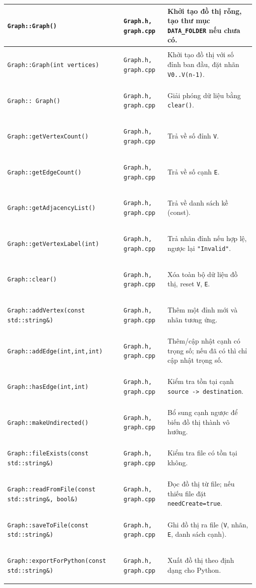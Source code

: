 \documentclass[14pt,a4paper]{report}
\begin{document}
\begin{longtable}{|>{\bfseries\raggedright\arraybackslash}p{}|
                   >{\bfseries\raggedright\arraybackslash}p{2.8cm}|
                   >{\raggedright\arraybackslash}p{}|}
\texttt{Graph::Graph()} & \texttt{Graph.h, graph.cpp} & Khởi tạo đồ thị rỗng, tạo thư mục \texttt{DATA\_FOLDER} nếu chưa có.\\ \hline
\texttt{Graph::Graph(int vertices)} & \texttt{Graph.h, graph.cpp} & Khởi tạo đồ thị với số đỉnh ban đầu, đặt nhãn \texttt{V0..V(n-1)}.\\ \hline
\texttt{Graph::~Graph()} & \texttt{Graph.h, graph.cpp} & Giải phóng dữ liệu bằng \texttt{clear()}.\\ \hline
\texttt{Graph::getVertexCount()} & \texttt{Graph.h, graph.cpp} & Trả về số đỉnh \texttt{V}.\\ \hline
\texttt{Graph::getEdgeCount()} & \texttt{Graph.h, graph.cpp} & Trả về số cạnh \texttt{E}.\\ \hline
\texttt{Graph::getAdjacencyList()} & \texttt{Graph.h, graph.cpp} & Trả về danh sách kề (const).\\ \hline
\texttt{Graph::getVertexLabel(int)} & \texttt{Graph.h, graph.cpp} & Trả nhãn đỉnh nếu hợp lệ, ngược lại \texttt{"Invalid"}.\\ \hline
\texttt{Graph::clear()} & \texttt{Graph.h, graph.cpp} & Xóa toàn bộ dữ liệu đồ thị, reset \texttt{V}, \texttt{E}.\\ \hline
\texttt{Graph::addVertex(const std::string\&)} & \texttt{Graph.h, graph.cpp} & Thêm một đỉnh mới và nhãn tương ứng.\\ \hline
\texttt{Graph::addEdge(int,int,int)} & \texttt{Graph.h, graph.cpp} & Thêm/cập nhật cạnh có trọng số; nếu đã có thì chỉ cập nhật trọng số.\\ \hline
\texttt{Graph::hasEdge(int,int)} & \texttt{Graph.h, graph.cpp} & Kiểm tra tồn tại cạnh \texttt{source -> destination}.\\ \hline
\texttt{Graph::makeUndirected()} & \texttt{Graph.h, graph.cpp} & Bổ sung cạnh ngược để biến đồ thị thành vô hướng.\\ \hline
\texttt{Graph::fileExists(const std::string\&)} & \texttt{Graph.h, graph.cpp} & Kiểm tra file có tồn tại không.\\ \hline
\texttt{Graph::readFromFile(const std::string\&, bool\&)} & \texttt{Graph.h, graph.cpp} & Đọc đồ thị từ file; nếu thiếu file đặt \texttt{needCreate=true}.\\ \hline
\texttt{Graph::saveToFile(const std::string\&)} & \texttt{Graph.h, graph.cpp} & Ghi đồ thị ra file (\texttt{V}, nhãn, \texttt{E}, danh sách cạnh).\\ \hline
\texttt{Graph::exportForPython(const std::string\&)} & \texttt{Graph.h, graph.cpp} & Xuất đồ thị theo định dạng cho Python.\\ \hline

\end{longtable}
\end{document}

